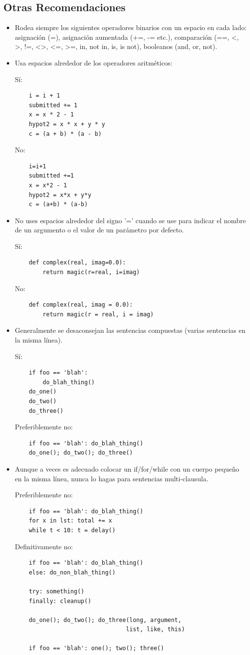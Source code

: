 \documentclass[a4paper,11pt,oneside]{book}
\begin{document}
\subsection{Otras Recomendaciones}
\begin{itemize}
\item Rodea siempre los siguientes operadores binarios con un espacio en cada lado: asignación (=), asignación aumentada (+=, -= etc.), comparación (==, <, >, !=, <>, <=, >=, in, not in, is, is not), booleanos (and, or, not).
\item Usa espacios alrededor de los operadores aritméticos:

Sí:
\begin{lstlisting}
    i = i + 1
    submitted += 1
    x = x * 2 - 1
    hypot2 = x * x + y * y
    c = (a + b) * (a - b)
\end{lstlisting}
No:
\begin{lstlisting}
    i=i+1
    submitted +=1
    x = x*2 - 1
    hypot2 = x*x + y*y
    c = (a+b) * (a-b)
\end{lstlisting}
\item No uses espacios alrededor del signo '=' cuando se use para indicar el nombre de un argumento o el valor de un parámetro por defecto.

Sí:
\begin{lstlisting}
    def complex(real, imag=0.0):
        return magic(r=real, i=imag)
\end{lstlisting}
No:
\begin{lstlisting}
    def complex(real, imag = 0.0):
        return magic(r = real, i = imag)
\end{lstlisting}
\item Generalmente se desaconsejan las sentencias compuestas (varias sentencias en la misma línea).

Sí:
\begin{lstlisting}
    if foo == 'blah':
        do_blah_thing()
    do_one()
    do_two()
    do_three()
\end{lstlisting}
Preferiblemente no:
\begin{lstlisting}
    if foo == 'blah': do_blah_thing()
    do_one(); do_two(); do_three()
\end{lstlisting}
\item Aunque a veces es adecuado colocar un if/for/while con un cuerpo pequeño en la misma línea, nunca lo hagas para sentencias multi-clausula.

Preferiblemente no:
\begin{lstlisting}
    if foo == 'blah': do_blah_thing()
    for x in lst: total += x
    while t < 10: t = delay()
\end{lstlisting}
Definitivamente no:
\begin{lstlisting}
    if foo == 'blah': do_blah_thing()
    else: do_non_blah_thing()

    try: something()
    finally: cleanup()

    do_one(); do_two(); do_three(long, argument,
                                list, like, this)

    if foo == 'blah': one(); two(); three()
\end{lstlisting}
\end{itemize}
\end{document}
